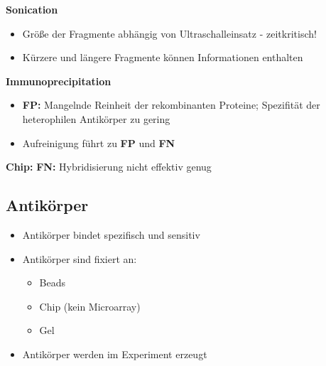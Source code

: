 \textbf{Sonication}
\begin{itemize}
	\item Größe der Fragmente abhängig von Ultraschalleinsatz - zeitkritisch!
	\item Kürzere und längere Fragmente können Informationen enthalten
\end{itemize}

\textbf{Immunoprecipitation}
\begin{itemize}
	\item \textbf{FP:} Mangelnde Reinheit der rekombinanten Proteine; Spezifität der heterophilen Antikörper zu gering
	\item Aufreinigung führt zu \textbf{FP} und \textbf{FN}
\end{itemize}

\textbf{Chip:} \textbf{FN:} Hybridisierung nicht effektiv genug

\subsection{Antikörper}
\begin{itemize}
	\item Antikörper bindet spezifisch und sensitiv
	\item Antikörper sind fixiert an:
	\begin{itemize}
		\item Beads
		\item Chip (kein Microarray)
		\item Gel
	\end{itemize}
	\item Antikörper werden im Experiment erzeugt
\end{itemize}

